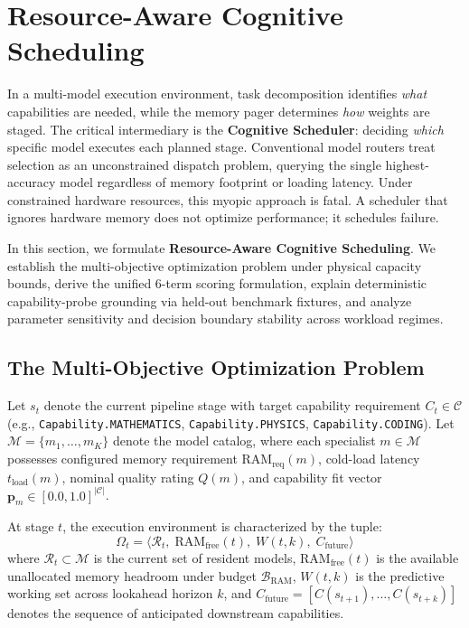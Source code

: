 \section{Resource-Aware Cognitive Scheduling}
\label{sec:cognitive_scheduling}

In a multi-model execution environment, task decomposition identifies \textit{what} capabilities are needed, while the memory pager determines \textit{how} weights are staged. The critical intermediary is the \textbf{Cognitive Scheduler}: deciding \textit{which} specific model executes each planned stage. Conventional model routers treat selection as an unconstrained dispatch problem, querying the single highest-accuracy model regardless of memory footprint or loading latency. Under constrained hardware resources, this myopic approach is fatal. A scheduler that ignores hardware memory does not optimize performance; it schedules failure. 

In this section, we formulate \textbf{Resource-Aware Cognitive Scheduling}. We establish the multi-objective optimization problem under physical capacity bounds, derive the unified 6-term scoring formulation, explain deterministic capability-probe grounding via held-out benchmark fixtures, and analyze parameter sensitivity and decision boundary stability across workload regimes.

\subsection{The Multi-Objective Optimization Problem}
\label{sec:scheduling_problem}

Let $s_t$ denote the current pipeline stage with target capability requirement $C_t \in \mathcal{C}$ (e.g., \texttt{Capability.MATHEMATICS}, \texttt{Capability.PHYSICS}, \texttt{Capability.CODING}). Let $\mathcal{M} = \{m_1, \dots, m_K\}$ denote the model catalog, where each specialist $m \in \mathcal{M}$ possesses configured memory requirement $\text{RAM}_{\text{req}}(m)$, cold-load latency $t_{\text{load}}(m)$, nominal quality rating $Q(m)$, and capability fit vector $\mathbf{p}_m \in [0.0, 1.0]^{|\mathcal{C}|}$.

At stage $t$, the execution environment is characterized by the tuple:
\begin{equation}
\Omega_t = \langle \mathcal{R}_t, \;\text{RAM}_{\text{free}}(t), \;W(t, k), \;C_{\text{future}} \rangle
\end{equation}
where $\mathcal{R}_t \subset \mathcal{M}$ is the current set of resident models, $\text{RAM}_{\text{free}}(t)$ is the available unallocated memory headroom under budget $\mathcal{B}_{\text{RAM}}$, $W(t, k)$ is the predictive working set across lookahead horizon $k$, and $C_{\text{future}} = [C(s_{t+1}), \dots, C(s_{t+k})]$ denotes the sequence of anticipated downstream capabilities.

